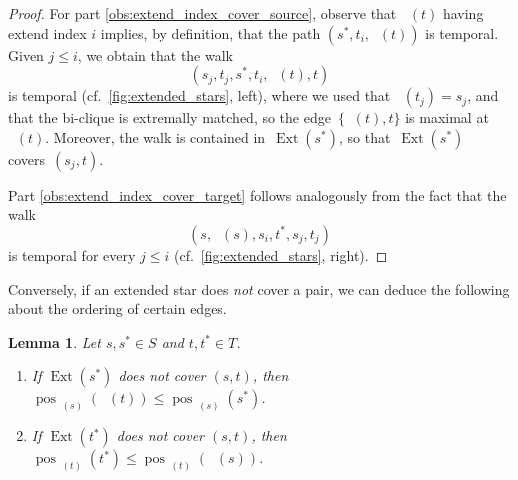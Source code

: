 \documentclass[11pt, letterpaper]{article}
\DeclareMathOperator{\pos}{pos}
\DeclareMathOperator{\minmat}{N_{\mathrm{min}}}
\DeclareMathOperator{\maxmat}{N_{\mathrm{max}}}
\DeclareMathOperator{\ext}{Ext}
\theoremstyle{definition}
\theoremstyle{plain}
\newtheorem{lemma}[definition]{Lemma}
\begin{document}
\begin{proof}
For part \ref{obs:extend_index_cover_source}, observe that $\maxmat(t)$ having extend index $i$ implies, by definition, that the path $(s^*,t_i, \maxmat(t))$ is temporal. 
Given $j\leq i$, we obtain that the walk 
\[
(s_j, t_j, s^*, t_i, \maxmat(t),t)
\] 
is temporal (cf.~\cref{fig:extended_stars}, left), where we used that $\minmat(t_j)=s_j$, and that the bi-clique is extremally matched, so the edge~$\{\maxmat(t),t\}$ is maximal at $\maxmat(t)$.
 Moreover, the walk is contained in~$\ext(s^*)$, so that~$\ext(s^*)$ covers~$(s_j, t)$.

Part \ref{obs:extend_index_cover_target} follows analogously from the fact that the walk 
\[
(s, \minmat(s),s_i,t^*,s_j, t_j)
\]
is temporal for every $j\leq i$ (cf.~\cref{fig:extended_stars}, right).
\end{proof}

Conversely, if an extended star does \emph{not} cover a pair, we can deduce the following about the ordering of certain edges.

\begin{lemma}
\label{lem:no_cover_consequence}
Let $s,s^*\in S$ and $t, t^* \in T$.
\begin{enumerate}[label=(\alph*)]
\item If $\ext(s^*)$ does \emph{not} cover $(s,t)$, then $\pos_{\minmat(s)}(\maxmat(t))\leq \pos_{\minmat(s)}(s^*)$.
\label{lem:no_cover_consequence_source}
\item If $\ext(t^*)$ does \emph{not} cover $(s,t)$, then $\pos_{\maxmat(t)}(t^*)\leq \pos_{\maxmat(t)}(\minmat(s))$.
\label{lem:no_cover_consequence_target}
\end{enumerate}
\end{lemma}
\end{document}
